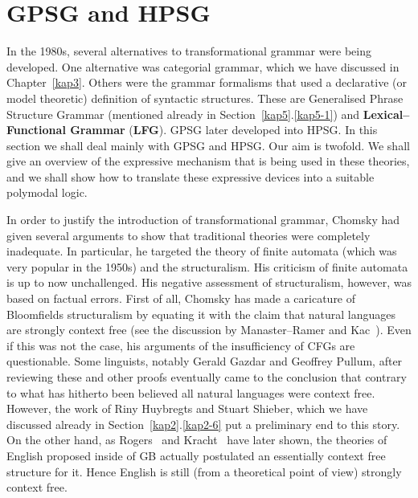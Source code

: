 \section{GPSG and HPSG}
\label{kap5-6}
%
%
%
In the 1980s, several alternatives to transformational grammar were
being developed. One alternative was categorial grammar, which we have
discussed in Chapter~\ref{kap3}. Others were the grammar
formalisms that used a declarative (or model theoretic) definition
of syntactic structures. These are 
Generalised Phrase Structure Grammar (mentioned already in
Section~\ref{kap5}.\ref{kap5-1}) and 
\label{Lexical Functional Grammar}%
\textbf{Le\-xi\-cal--Func\-tio\-nal Grammar} (\textbf{LFG}).
GPSG later developed into 
HPSG. In  this section we shall deal mainly with GPSG and HPSG. 
Our aim is twofold. We shall give an overview of the
expressive mechanism that is being used in these theories,
and we shall show how to translate these expressive devices
into a suitable polymodal logic.

In order to justify the introduction of transformational grammar, Chomsky 
had given several arguments to show that traditional 
theories were completely inadequate. In particular, he targeted 
the theory of finite automata (which was very popular in the 1950s) 
and the structuralism. His criticism of finite automata is up to 
now unchallenged. His negative assessment of structuralism, however, 
was based on factual errors. First of all, Chomsky has made a 
caricature of Bloomfields 
structuralism by equating it with the 
claim that natural languages are strongly context free (see the 
discussion by Manaster--Ramer 
and Kac~). Even if
this was not the case, his arguments of the insufficiency of CFGs
are questionable. Some linguists, notably Gerald Gazdar 
and Geoffrey Pullum, after reviewing these and other proofs
eventually came to the conclusion that contrary to what has
hitherto been believed all natural languages were context free.
However, the work of Riny Huybregts 
and Stuart Shieber, 
which we have discussed already in Section~\ref{kap2}.\ref{kap2-6} 
put a preliminary end to this story. On the other hand, as 
Rogers~ 
and Kracht~ 
have later shown, the theories of 
English proposed inside of GB actually postulated an essentially 
context free structure for it. Hence English is still (from a 
theoretical point of view) strongly context free.

